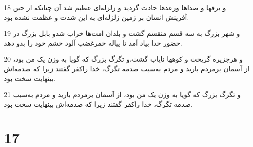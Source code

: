 \par 18 و برقها و صداها ورعدها حادث گردید و زلزله‌ای عظیم شد آن چنانکه از حین آفرینش انسان بر زمین زلزله‌ای به این شدت و عظمت نشده بود.
\par 19 و شهر بزرگ به سه قسم منقسم گشت و بلدان امت‌ها خراب شدو بابل بزرگ در حضور خدا بیاد آمد تا پیاله خمرغضب آلود خشم خود را بدو دهد.
\par 20 و هرجزیره گریخت و کوهها نایاب گشت،و تگرگ بزرگ که گویا به وزن یک من بود، از آسمان برمردم بارید و مردم به‌سبب صدمه تگرگ، خدا راکفر گفتند زیرا که صدمه‌اش بینهایت سخت بود.
\par 21 و تگرگ بزرگ که گویا به وزن یک من بود، از آسمان برمردم بارید و مردم به‌سبب صدمه تگرگ، خدا راکفر گفتند زیرا که صدمه‌اش بینهایت سخت بود.

\chapter{17}

